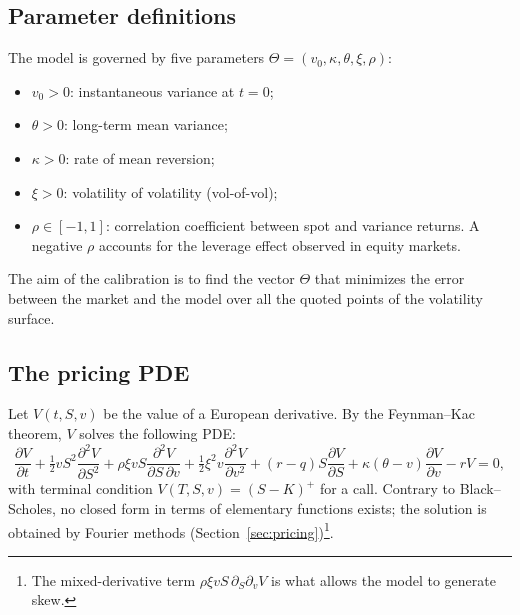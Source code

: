 \documentclass[11pt,a4paper]{article}
\theoremstyle{plain}
\theoremstyle{definition}
\begin{document}
\subsection{Parameter definitions}
The model is governed by five parameters $\Theta = (v_0, \kappa, \theta, \xi, \rho)$:
\begin{itemize}
    \item $v_0 > 0$: instantaneous variance at $t=0$;
    \item $\theta > 0$: long-term mean variance;
    \item $\kappa > 0$: rate of mean reversion;
    \item $\xi > 0$: volatility of volatility (vol-of-vol);
    \item $\rho \in [-1, 1]$: correlation coefficient between spot and variance returns. A negative $\rho$ accounts for the leverage effect observed in equity markets.
\end{itemize}
The aim of the calibration is to find the vector $\Theta$ that minimizes the error between the market and the model over all the quoted points of the volatility surface.

\subsection{The pricing PDE}
Let $V(t,S,v)$ be the value of a European derivative. By the Feynman--Kac theorem, $V$ solves the following PDE:
\begin{equation}
    \frac{\partial V}{\partial t} + \tfrac12 v S^2\frac{\partial^2 V}{\partial S^2}
    + \rho\xi v S\frac{\partial^2 V}{\partial S\,\partial v}
    + \tfrac12\xi^2 v\frac{\partial^2 V}{\partial v^2}
    + (r-q)S\frac{\partial V}{\partial S}
    + \kappa(\theta-v)\frac{\partial V}{\partial v}
    - rV = 0,
    \label{eq:hestonpde}
\end{equation}
with terminal condition $V(T,S,v)=(S-K)^+$ for a call. Contrary to Black--Scholes, no closed form in terms of elementary functions exists; the solution is obtained by Fourier methods (Section~\ref{sec:pricing})\footnote{ The mixed-derivative term $\rho\xi vS\,\partial_{S}\partial_{v}V$ is what allows the model to generate skew.}.
\end{document}
